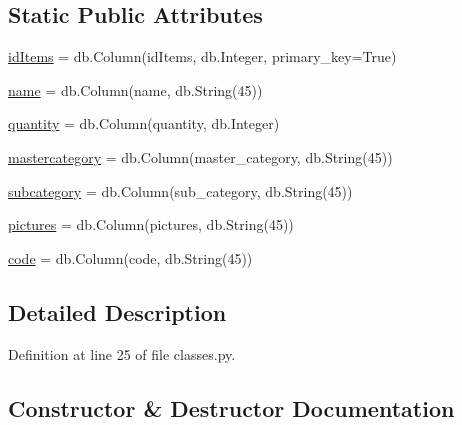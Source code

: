 \subsection*{Static Public Attributes}
\begin{DoxyCompactItemize}
\item 
\hyperlink{class_web_content_1_1classes_1_1items_ae81c7aff4b6699e4b73fdc2c58e7c17f}{id\+Items} = db.\+Column(\textquotesingle{}id\+Items\textquotesingle{}, db.\+Integer, primary\+\_\+key=True)
\item 
\hyperlink{class_web_content_1_1classes_1_1items_a6b9cc2755a793d5710d6aaa583c64ed7}{name} = db.\+Column(\textquotesingle{}name\textquotesingle{}, db.\+String(45))
\item 
\hyperlink{class_web_content_1_1classes_1_1items_ad3adf84b02910cbad246217c240b9bc1}{quantity} = db.\+Column(\textquotesingle{}quantity\textquotesingle{}, db.\+Integer)
\item 
\hyperlink{class_web_content_1_1classes_1_1items_a921e7c462d24e352af1c6386e33d4a54}{mastercategory} = db.\+Column(\textquotesingle{}master\+\_\+category\textquotesingle{}, db.\+String(45))
\item 
\hyperlink{class_web_content_1_1classes_1_1items_abf504f02bb8165be106746d68ea6500a}{subcategory} = db.\+Column(\textquotesingle{}sub\+\_\+category\textquotesingle{}, db.\+String(45))
\item 
\hyperlink{class_web_content_1_1classes_1_1items_a84d35b34ce8cd95db165e325ce94f043}{pictures} = db.\+Column(\textquotesingle{}pictures\textquotesingle{}, db.\+String(45))
\item 
\hyperlink{class_web_content_1_1classes_1_1items_a0b093c44310dcd97c97580ef744ab1cd}{code} = db.\+Column(\textquotesingle{}code\textquotesingle{}, db.\+String(45))
\end{DoxyCompactItemize}


\subsection{Detailed Description}


Definition at line 25 of file classes.\+py.



\subsection{Constructor \& Destructor Documentation}
\mbox{\label{class_web_content_1_1classes_1_1items_a69e23b8eb679a8f5fe127d05368f146c}} 
